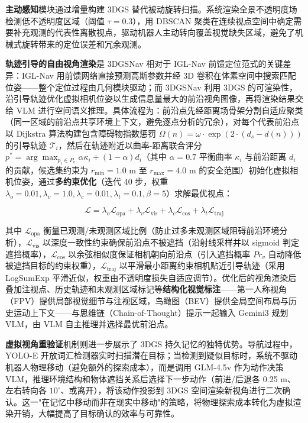 \textbf{主动感知}模块通过增量构建 3DGS 替代被动旋转扫描。系统渲染全景不透明度场检测低不透明度区域（阈值 $\tau=0.3$），用 DBSCAN 聚类在连续视点空间中确定需要补充观测的代表性离散视点，驱动机器人主动转向覆盖视觉缺失区域，避免了机械式旋转带来的定位误差和冗余观测。

\textbf{轨迹引导的自由视角渲染}是 3DGSNav 相对于 IGL-Nav 前馈定位范式的关键差异：IGL-Nav 用前馈网络直接预测高斯参数并经 3D 卷积在体素空间中搜索匹配位姿——整个定位过程由几何模块驱动；而 3DGSNav 利用 3DGS 的可渲染性，沿引导轨迹优化虚拟相机位姿以生成信息量最大的前沿视角图像，再将渲染结果交给 VLM 进行空间语义推理。具体流程为：前沿点先经距离场骨架分割自适应聚类（同一区域的前沿点共享环境上下文，避免逐点分析的冗余），对每个代表前沿点以 Dijkstra 算法构建包含障碍物指数惩罚 $\Omega(n)=\omega\cdot\exp(2\cdot(d_s-d(n)))$ 的引导轨迹 $\mathcal{T}_i$，然后在轨迹附近以曲率-距离联合评分 $p^* = \arg\max_{p_i \in P_v} \alpha \kappa_i + (1-\alpha) d_i$（其中 $\alpha=0.7$ 平衡曲率 $\kappa_i$ 与前沿距离 $d_i$ 的贡献，候选集约束为 $r_\text{min}=1.0$ m 至 $r_\text{max}=4.0$ m 的安全范围）初始化虚拟相机位姿，通过\textbf{多约束优化}（迭代 40 步，权重 $\lambda_o=0.01, \lambda_v=1.0, \lambda_c=0.01, \lambda_t=0.1, \beta=5$）求解最优视点：

\begin{equation}
\mathcal{L} = \lambda_o \mathcal{L}_\text{opa} + \lambda_v \mathcal{L}_\text{vis} + \lambda_c \mathcal{L}_\text{cos} + \lambda_t \mathcal{L}_\text{traj}
\end{equation}

其中 $\mathcal{L}_\text{opa}$ 衡量已观测/未观测区域比例（防止过多未观测区域阻碍前沿环境分析），$\mathcal{L}_\text{vis}$ 以深度一致性约束确保前沿点不被遮挡（沿射线采样并以 sigmoid 判定遮挡概率），$\mathcal{L}_\text{cos}$ 以余弦相似度保证相机朝向前沿点（引入遮挡概率 $Pr_v$ 自动降低被遮挡目标的约束权重），$\mathcal{L}_\text{traj}$ 以平滑最小距离约束相机贴近引导轨迹（采用 LogSumExp 平滑近似，权重由不透明度损失自适应调节）。优化后的视角渲染后叠加注视点、历史轨迹和未观测区域标记等\textbf{结构化视觉标注}——第一人称视角（FPV）提供局部视觉细节与注视区域，鸟瞰图（BEV）提供全局空间布局与历史运动上下文——与思维链（Chain-of-Thought）提示一起输入 Gemini3 规划 VLM，由 VLM 自主推理并选择最优前沿点。

\textbf{虚拟视角重验证}机制则进一步展示了 3DGS 持久记忆的独特优势。导航过程中，YOLO-E 开放词汇检测器实时扫描潜在目标；当检测到疑似目标时，系统不驱动机器人物理移动（避免额外的探索成本），而是调用 GLM-4.5v 作为动作决策 VLM，推理环境结构和物体遮挡关系后选择下一步动作（前进/后退各 0.25 m、左右转向各 $10^\circ$、或离开），将该动作投影到 3DGS 空间渲染新视角进行二次确认。这一"在记忆中移动而非在现实中移动"的策略，将物理探索成本转化为虚拟渲染开销，大幅提高了目标确认的效率与可靠性。

